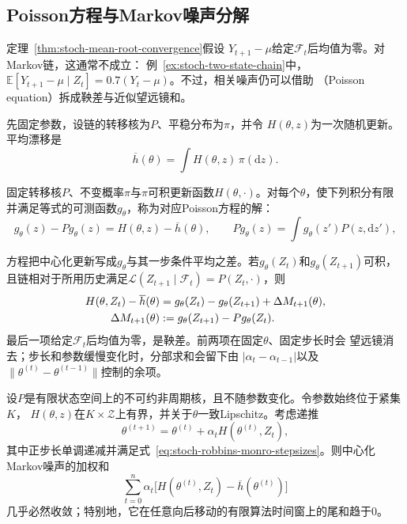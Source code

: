 \subsection{Poisson方程与Markov噪声分解}

定理~\ref{thm:stoch-mean-root-convergence}假设
$Y_{t+1}-\mu$给定$\mathcal{F}_t$后均值为零。对Markov链，这通常不成立：
例~\ref{ex:stoch-two-state-chain}中，
$\mathbb{E}[Y_{t+1}-\mu\mid Z_t]=0.7(Y_t-\mu)$。不过，相关噪声仍可以借助
（Poisson equation）拆成鞅差与近似望远镜和。

先固定参数，设链的转移核为$P$、平稳分布为$\pi$，并令
$H(\theta,z)$为一次随机更新。平均漂移是
\begin{equation}
  \overline h(\theta)=\int H(\theta,z)\,\pi(\mathrm{d}z).
  \label{eq:stoch-markov-mean-field}
\end{equation}
\begin{definition}[Markov核的Poisson方程]
  \label{def:stoch-markov-poisson-equation}
固定转移核\(P\)、不变概率\(\pi\)与\(\pi\)可积更新函数\(H(\theta,\cdot)\)。对每个$\theta$，使下列积分有限并满足等式的可测函数$g_\theta$，称为对应Poisson方程的解：
\begin{equation}
  g_\theta(z)-Pg_\theta(z)
  =
  H(\theta,z)-\overline h(\theta),
  \qquad
  Pg_\theta(z)
  =
  \int g_\theta(z')P(z,\mathrm{d}z'),
  \label{eq:stoch-poisson-equation}
\end{equation}
\end{definition}
方程把中心化更新写成\(g_\theta\)与其一步条件平均之差。若\(g_\theta(Z_t)\)和\(g_\theta(Z_{t+1})\)可积，且链相对于所用历史满足\(\mathcal L(Z_{t+1}\mid\mathcal F_t)=P(Z_t,\cdot)\)，则
\begin{align}
  H(\theta,Z_t)-\overline h(\theta)
  &=
  g_\theta(Z_t)-g_\theta(Z_{t+1})
  +
  \Delta M_{t+1}(\theta),
  \label{eq:stoch-poisson-decomposition}\\
  \Delta M_{t+1}(\theta)
  &:=
  g_\theta(Z_{t+1})-Pg_\theta(Z_t).
  \notag
\end{align}
最后一项给定$\mathcal{F}_t$后均值为零，是鞅差。前两项在固定$\theta$、固定步长时会
望远镜消去；步长和参数缓慢变化时，分部求和会留下由
$|\alpha_t-\alpha_{t-1}|$以及
$\lVert\theta^{(t)}-\theta^{(t-1)}\rVert$控制的余项。

\begin{lemma}[固定有限链的加权Poisson分解]
  \label{lem:stoch-finite-chain-poisson-sum}
  设$P$是有限状态空间上的不可约非周期核，且不随参数变化。令参数始终位于紧集$K$，
  $H(\theta,z)$在$K\times\mathcal{Z}$上有界，并关于$\theta$一致Lipschitz。考虑递推
  \[
    \theta^{(t+1)}
    =
    \theta^{(t)}+\alpha_tH(\theta^{(t)},Z_t),
  \]
  其中正步长单调递减并满足式~\eqref{eq:stoch-robbins-monro-stepsizes}。则中心化
  Markov噪声的加权和
  \[
    \sum_{t=0}^{n}\alpha_t
    \bigl[
      H(\theta^{(t)},Z_t)-\overline h(\theta^{(t)})
    \bigr]
  \]
  几乎必然收敛；特别地，它在任意向后移动的有限算法时间窗上的尾和趋于$0$。
\end{lemma}

